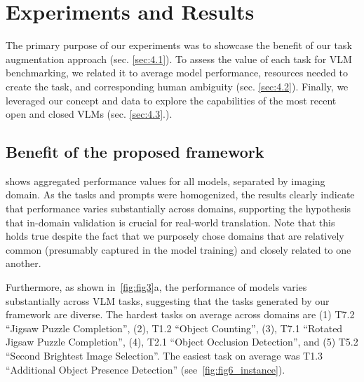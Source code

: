 


\section{Experiments and Results}
The primary purpose of our experiments was to showcase the benefit of our task augmentation approach (sec. \ref{sec:4.1}). To assess the value of each task for VLM benchmarking, we related it to average model performance, resources needed to create the task, and corresponding human ambiguity (sec. \ref{sec:4.2}). Finally, we leveraged our concept and data to explore the capabilities of the most recent open and closed VLMs (sec. \ref{sec:4.3}.).


\subsection{Benefit of the proposed framework
\label{sec:4.1}
}
 shows aggregated performance values for all models, separated by imaging domain. As the tasks and prompts were homogenized, the results clearly indicate that performance varies substantially across domains, supporting the hypothesis that in-domain validation is crucial for real-world translation. Note that this holds true despite the fact that we purposely chose domains that are relatively common (presumably captured in the model training) and closely related to one another.


Furthermore, as shown in~\cref{fig:fig3}a, the performance of models varies substantially across VLM tasks, suggesting that the tasks generated by our framework are diverse. The hardest tasks on average across domains are (1) T7.2 “Jigsaw Puzzle Completion”, (2), T1.2 “Object Counting”, (3), T7.1 “Rotated Jigsaw Puzzle Completion”, (4), T2.1 “Object Occlusion Detection”, and (5) T5.2 “Second Brightest Image Selection”. The easiest task on average was T1.3 “Additional Object Presence Detection” (see~\cref{fig:fig6_instance}).

